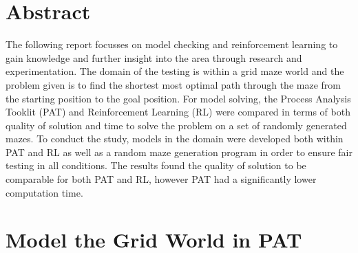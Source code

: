 \documentclass[twoside, 12pt, a4paper]{article}
\begin{document}


\pagestyle{fancy}
\fancyfoot[C]{\thepage}
\fancyfoot[L,R]{}
\setcounter{page}{1}

\newpage


\tableofcontents



\newpage
{}
\setcounter{page}{1}
\pagestyle{fancy}

\fancyfoot[LE,RO]{\thepage}
\fancyfoot[C]{}
\section{Abstract}
The following report focusses on model checking and reinforcement learning to gain knowledge and further insight into the area through research and experimentation. The domain of the testing is within a grid maze world and the problem given is to find the shortest most optimal path through the maze from the starting position to the goal position. For model solving, the Process Analysis Tooklit (PAT) and Reinforcement Learning (RL) were compared in terms of both quality of solution and time to solve the problem on a set of randomly generated mazes. To conduct the study, models in the domain were developed both within PAT and RL as well as a random maze generation program in order to ensure fair testing in all conditions. The results found the quality of solution to be comparable for both PAT and RL, however PAT had a significantly lower computation time.

\section{Model the Grid World in PAT}  \label{CSys_AandD}
\end{document}
